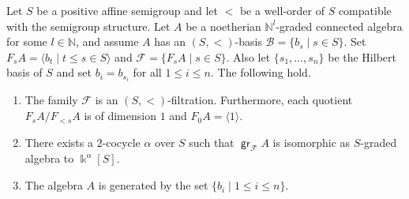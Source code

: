 \documentclass[11pt,fleqn]{article}
\newcommand\NN{\mathbb N}
\newcommand\B{\mathcal B}
\newcommand\F{\mathcal F}
\renewcommand\k{\Bbbk}
\DeclareMathOperator\gr{\mathsf{gr}}
\begin{document}
\begin{Lemma*}
Let $S$ be a positive affine semigroup and let $<$ be a well-order of $S$
compatible with the semigroup structure. 
Let $A$ be a noetherian $\NN^l$-graded connected algebra for some $l \in \NN$, 
and assume $A$ has an $(S,<)$-basis $\B = \{b_s \mid s \in S\}$. 
Set $F_sA = \langle b_t \mid t \leq s \in S \rangle$ and $\F = \{F_sA \mid s 
\in S\}$. Also let $\{s_1, \ldots, s_n\}$ be the Hilbert basis of $S$ and set 
$b_i = b_{s_i}$ for all $1 \leq i \leq n$. The following hold.
\begin{enumerate}
\item The family $\F$ is an $(S,<)$-filtration. Furthermore,
each quotient $F_sA / F_{<s}A$ is of dimension $1$ and $F_0A = \langle 1 
\rangle$.

\item There exists a $2$-cocycle $\alpha$ over $S$ such that $\gr_\F A$ is 
isomorphic as $S$-graded algebra to $\k^\alpha[S]$.

\item The algebra $A$ is generated by the set $\{b_i \mid 1 \leq i \leq n\}$.
\end{enumerate} 
\end{Lemma*}
\end{document}
